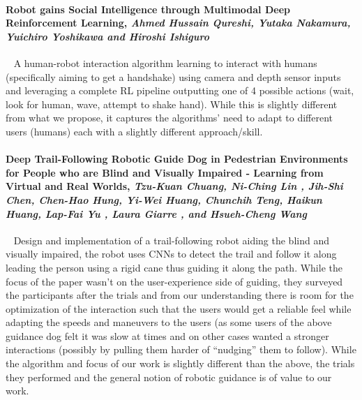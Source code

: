 \documentclass[a4paper,11pt]{article}
\begin{document}
\paragraph{Robot gains Social Intelligence through Multimodal Deep Reinforcement Learning, \textit{Ahmed Hussain Qureshi, Yutaka Nakamura, Yuichiro Yoshikawa and Hiroshi Ishiguro}} ~\cite{qureshi2016robot}
A human-robot interaction algorithm learning to interact with humans (specifically aiming to get a handshake) using camera and depth sensor inputs and leveraging a complete RL pipeline outputting one of 4 possible actions (wait, look for human, wave, attempt to shake hand). While this is slightly different from what we propose, it captures the algorithms’ need to adapt to different users (humans) each with a slightly different approach/skill. 



\paragraph{Deep Trail-Following Robotic Guide Dog in Pedestrian Environments for People who are Blind and Visually Impaired - Learning from Virtual and Real Worlds, \textit{Tzu-Kuan Chuang, Ni-Ching Lin , Jih-Shi Chen, Chen-Hao Hung, Yi-Wei Huang, Chunchih Teng, Haikun Huang, Lap-Fai Yu , Laura Giarre , and Hsueh-Cheng Wang}} ~\cite{chuang2018deep}
Design and implementation of a trail-following robot aiding the blind and visually impaired, the robot uses CNNs to detect the trail and follow it along leading the person using a rigid cane thus guiding it along the path. While the focus of the paper wasn’t on the user-experience side of guiding, they surveyed the participants after the trials and from our understanding there is room for the optimization of the interaction such that the users would get a reliable feel while adapting the speeds and maneuvers to the users (as some users of the above guidance dog felt it was slow at times and on other cases wanted a stronger interactions (possibly by pulling them harder of “nudging” them to follow). While the algorithm and focus of our work is slightly different than the above, the trials they performed and the general notion of robotic guidance is of value to our work.
\end{document}
